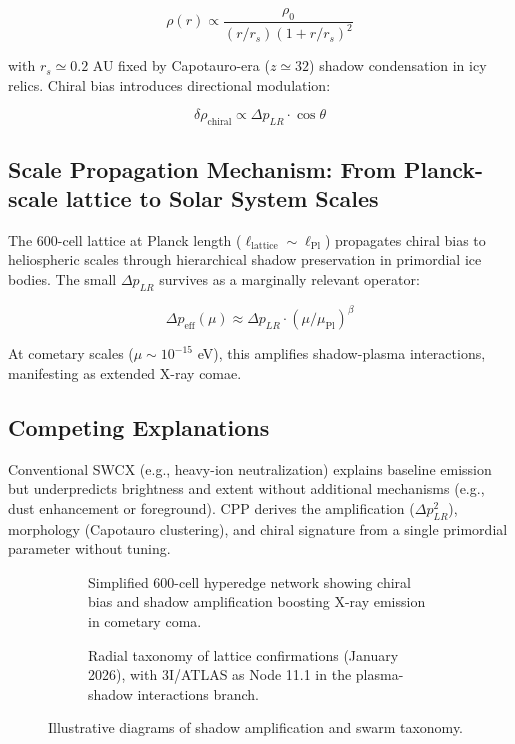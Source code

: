 \documentclass[11pt]{article}
\begin{document}
\[
\rho(r) \propto \frac{\rho_0}{(r/r_s)(1 + r/r_s)^2}
\]

with $r_s \simeq 0.2$ AU fixed by Capotauro-era ($z \simeq 32$) shadow condensation in icy relics. Chiral bias introduces directional modulation:

\[
\delta \rho_{\text{chiral}} \propto \Delta p_{LR} \cdot \cos\theta
\]

\subsection{Scale Propagation Mechanism: From Planck-scale lattice to Solar System Scales}
The 600-cell lattice at Planck length ($\ell_{\text{lattice}} \sim \ell_{\text{Pl}}$) propagates chiral bias to heliospheric scales through hierarchical shadow preservation in primordial ice bodies. The small $\Delta p_{LR}$ survives as a marginally relevant operator:

\[
\Delta p_{\text{eff}}(\mu) \approx \Delta p_{LR} \cdot (\mu / \mu_{\text{Pl}})^\beta
\]

At cometary scales ($\mu \sim 10^{-15}$ eV), this amplifies shadow-plasma interactions, manifesting as extended X-ray comae.

\subsection{Competing Explanations}
Conventional SWCX (e.g., heavy-ion neutralization) explains baseline emission but underpredicts brightness and extent without additional mechanisms (e.g., dust enhancement or foreground). CPP derives the amplification ($\Delta p_{LR}^2$), morphology (Capotauro clustering), and chiral signature from a single primordial parameter without tuning.

\begin{figure}[htbp]
\centering
\begin{subfigure}{0.45\textwidth}
\centering
\caption{Simplified 600-cell hyperedge network showing chiral bias and shadow amplification boosting X-ray emission in cometary coma.}
\label{fig:shadow-amp}
\end{subfigure}
\hfill
\begin{subfigure}{0.45\textwidth}
\centering
\caption{Radial taxonomy of lattice confirmations (January 2026), with 3I/ATLAS as Node 11.1 in the plasma-shadow interactions branch.}
\label{fig:taxonomy}
\end{subfigure}
\caption{Illustrative diagrams of shadow amplification and swarm taxonomy.}
\end{figure}
\end{document}
